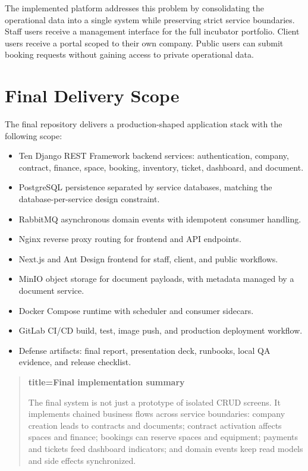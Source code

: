 \documentclass[12pt,a4paper]{report}
\newenvironment{resultbox}[1][]{\begin{quote}\noindent\textbf{#1}\par\smallskip}{\end{quote}}
\begin{document}
The implemented platform addresses this problem by consolidating the operational
data into a single system while preserving strict service boundaries. Staff users
receive a management interface for the full incubator portfolio. Client users
receive a portal scoped to their own company. Public users can submit booking
requests without gaining access to private operational data.

\section{Final Delivery Scope}
\label{sec:final-scope}

The final repository delivers a production-shaped application stack with the
following scope:
\begin{itemize}
  \item Ten Django REST Framework backend services: authentication, company,
  contract, finance, space, booking, inventory, ticket, dashboard, and document.
  \item PostgreSQL persistence separated by service databases, matching the
  database-per-service design constraint.
  \item RabbitMQ asynchronous domain events with idempotent consumer handling.
  \item Nginx reverse proxy routing for frontend and API endpoints.
  \item Next.js and Ant Design frontend for staff, client, and public workflows.
  \item MinIO object storage for document payloads, with metadata managed by a
  document service.
  \item Docker Compose runtime with scheduler and consumer sidecars.
  \item GitLab CI/CD build, test, image push, and production deployment workflow.
  \item Defense artifacts: final report, presentation deck, runbooks, local QA
  evidence, and release checklist.
\end{itemize}

\begin{resultbox}[title=Final implementation summary]
The final system is not just a prototype of isolated CRUD screens. It implements
chained business flows across service boundaries: company creation leads to
contracts and documents; contract activation affects spaces and finance;
bookings can reserve spaces and equipment; payments and tickets feed dashboard
indicators; and domain events keep read models and side effects synchronized.
\end{resultbox}
\end{document}
